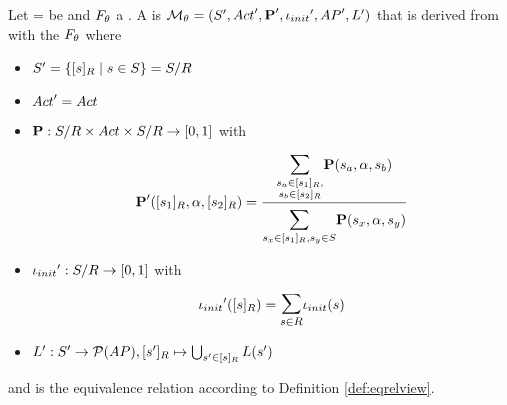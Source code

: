 \documentclass[preview]{standalone}
\begin{document}
\begin{definition}
	
	Let \chgph = \chgphtuple be \chgphN and ${F_{{\theta}}}$ a \grpfctN. A \emph{\viewN} is \chgphN ${{{{\mathcal{M}}}}_{{\theta}}} = {{({S}', {Act}', {\textbf{P}}', {\iota_{init}}', {AP}', {L}')}}$ that is derived from \mdp with the \grpfctN ${F_{{\theta}}}$ where
	
	\begin{itemize}
				\item ${S}' = \{ {[{s}]_{{R}}} \mid {s} \in {S} \} = {{{S}}/{R}}$
				
				\item ${Act}' = {Act}$
				
				
				\item ${\textbf{P}} : {{{S}}/{R}} \times {Act} \times {{\ensuremath{{S}}}/\ensuremath{{R}}} \to [0,1]$ with 
				\[ 
				\probtfunc'(\eqclassv[\state_1], \action, \eqclassv[\state_2]) = 
				\frac
				{\bbigsum{\substack{\state_a \in \eqclassv[\state_1], \\ \state_b \in \eqclassv[\state_2]}}\probtfunc(\state_a, \action, \state_b) }
				{\bbigsum{\state_x \in \eqclassv[\state_1], \state_y \in \states} \probtfunc(\state_x, \action, \state_y)}
				\]
				
				
				\item ${\iota_{init}}' : {{{S}}/{R}} \to [0,1]$ with 
				\[
				\initdistrib'(\eqclassv) = \bbigsum{\state \in \eqrelview} \initdistrib(\state)
				\]
							
				\item ${L}': {S}' \to {\mathcal{P}(\ensuremath{{AP}})}, {{[{s}']_{{R}}}} \mapsto \bigcup_{{s}' \in {\ensuremath{{[{s}]_{{R}}}}}} {L}({s}')$
				
			\end{itemize}
	and \eqrelview is the equivalence relation according to Definition \ref{def:eqrelview}.
	

	\label{def:view}	
\end{definition}
\end{document}
